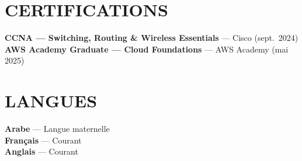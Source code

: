 \documentclass[10pt,a4paper]{article}
\begin{document}
\vspace{1pt}
\begin{minipage}[t]{0.70\textwidth}
\section{CERTIFICATIONS}
{\small
\textbf{\color{primary}CCNA — Switching, Routing \& Wireless Essentials} — Cisco (sept.\ 2024)\\[1pt]
\textbf{\color{primary}AWS Academy Graduate — Cloud Foundations} — AWS Academy (mai 2025)
}
\end{minipage}%
\hfill
\begin{minipage}[t]{0.26\textwidth}
\section{LANGUES}
{\small\textbf{Arabe} — Langue maternelle}\\[1pt]
{\small\textbf{Français} — Courant}\\[1pt]
{\small\textbf{Anglais} — Courant}
\end{minipage}
\end{document}
